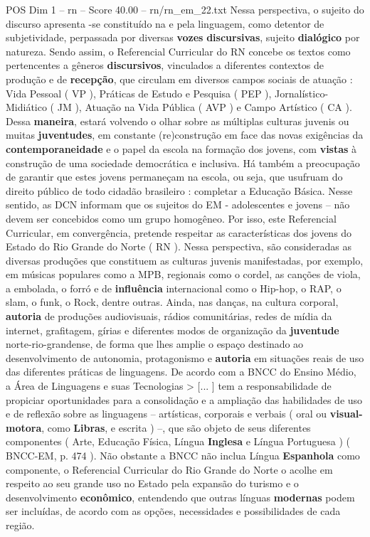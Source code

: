 \begin{textsample}{POS Dim 1 – rn – Score 40.00 – rn/rn\_em\_22.txt}
Nessa perspectiva, o sujeito do discurso apresenta -se constituído na e pela linguagem, como detentor de subjetividade, perpassada por diversas \textbf{vozes} \textbf{discursivas}, sujeito \textbf{dialógico} por natureza.
Sendo assim, o Referencial Curricular do RN concebe os textos como pertencentes a gêneros \textbf{discursivos}, vinculados a diferentes contextos de produção e de \textbf{recepção}, que circulam em diversos campos sociais de atuação : Vida Pessoal ( VP ), Práticas de Estudo e Pesquisa ( PEP ), Jornalístico-Midiático ( JM ), Atuação na Vida Pública ( AVP ) e Campo Artístico ( CA ).
Dessa \textbf{maneira}, estará volvendo o olhar sobre as múltiplas culturas juvenis ou muitas \textbf{juventudes}, em constante (re)construção em face das novas exigências da \textbf{contemporaneidade} e o papel da escola na formação dos jovens, com \textbf{vistas} à construção de uma sociedade democrática e inclusiva.
Há também a preocupação de garantir que estes jovens permaneçam na escola, ou seja, que usufruam do direito público de todo cidadão brasileiro : completar a Educação Básica.
Nesse sentido, as DCN informam que os sujeitos do EM - adolescentes e jovens – não devem ser concebidos como um grupo homogêneo.
Por isso, este Referencial Curricular, em convergência, pretende respeitar as características dos jovens do Estado do Rio Grande do Norte ( RN ).
Nessa perspectiva, são consideradas as diversas produções que constituem as culturas juvenis manifestadas, por exemplo, em músicas populares como a MPB, regionais como o cordel, as canções de viola, a embolada, o forró e de \textbf{influência} internacional como o Hip-hop, o RAP, o slam, o funk, o Rock, dentre outras.
Ainda, nas danças, na cultura corporal, \textbf{autoria} de produções audiovisuais, rádios comunitárias, redes de mídia da internet, grafitagem, gírias e diferentes modos de organização da \textbf{juventude} norte-rio-grandense, de forma que lhes amplie o espaço destinado ao desenvolvimento de autonomia, protagonismo e \textbf{autoria} em situações reais de uso das diferentes práticas de linguagens.
De acordo com a BNCC do Ensino Médio, a Área de Linguagens e suas Tecnologias > [... ] tem a responsabilidade de propiciar oportunidades para a consolidação e a ampliação das habilidades de uso e de reflexão sobre as linguagens – artísticas, corporais e verbais ( oral ou \textbf{visual-motora}, como \textbf{Libras}, e escrita ) –, que são objeto de seus diferentes componentes ( Arte, Educação Física, Língua \textbf{Inglesa} e Língua Portuguesa ) ( BNCC-EM, p. 474 ).
Não obstante a BNCC não inclua Língua \textbf{Espanhola} como componente, o Referencial Curricular do Rio Grande do Norte o acolhe em respeito ao seu grande uso no Estado pela expansão do turismo e o desenvolvimento \textbf{econômico}, entendendo que outras línguas \textbf{modernas} podem ser incluídas, de acordo com as opções, necessidades e possibilidades de cada região.

\end{textsample}
